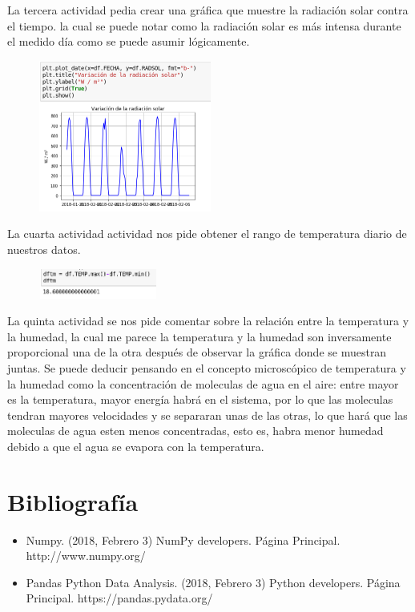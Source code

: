 \documentclass{article}
\begin{document}
La tercera actividad pedia crear una gráfica que muestre la radiación solar contra el tiempo. la cual se puede notar como la radiación solar es más intensa durante el medido día como se puede asumir lógicamente.
\begin{figure}[h]
\centering
\includegraphics[height=188px,width=214px]{17thcell.png}
\end{figure}

La cuarta actividad actividad nos pide obtener el rango de temperatura diario de nuestros datos.
\begin{figure}[h]
\centering
\includegraphics[height=37px,width=147px]{18thcell.png}
\end{figure}

La quinta actividad se nos pide comentar sobre la relación entre la temperatura y la humedad, la cual me parece la temperatura y la humedad son inversamente proporcional una de la otra después de observar la gráfica donde se muestran juntas. Se puede deducir pensando en el concepto microscópico de temperatura y la humedad como la concentración de moleculas de agua en el aire: entre mayor es la temperatura, mayor energía habrá en el sistema, por lo que las moleculas tendran mayores velocidades y se separaran unas de las otras, lo que hará que las moleculas de agua esten menos concentradas, esto es, habra menor humedad debido a que el agua se evapora con la temperatura.

\newpage

\section{Bibliografía}
\begin{itemize}
\item Numpy. (2018, Febrero 3) NumPy developers. Página Principal. http://www.numpy.org/
\item Pandas Python Data Analysis. (2018, Febrero 3) Python developers. Página Principal. https://pandas.pydata.org/ 
\end{itemize}
\end{document}
